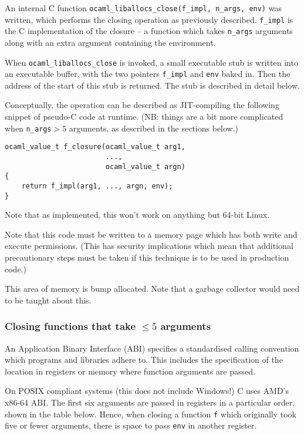 \documentclass[12pt,a4paper,twoside,openright]{report}
\begin{document}
An internal C function \lstinline{ocaml_liballocs_close(f_impl, n_args, env)}
was written, which performs the closing operation as previously described.
\lstinline!f_impl! is the C implementation of the closure -- a function which
takes \lstinline!n_args! arguments along with an extra argument containing the environment.

When \lstinline!ocaml_liballocs_close! is
invoked, a small executable stub is written into an executable
buffer, with the two pointers \lstinline!f_impl! and \lstinline!env! baked in.
Then the address of the start of this stub is returned. The stub is described
in detail below.

Conceptually, the operation can be described as JIT-compiling the following
snippet of pseudo-C code at runtime. (NB: things are a bit more complicated
when \lstinline!n_args!${} > 5$ arguments, as described in the sections below.)

\begin{lstlisting}
ocaml_value_t f_closure(ocaml_value_t arg1,
                        ...,
                        ocaml_value_t argn)
{
    return f_impl(arg1, ..., argn, env);
}
\end{lstlisting}

Note that as implemented, this won't work on anything but 64-bit Linux.

Note that this code must be written to a memory page which has both write and
execute permissions. (This has security implications which mean that additional
precautionary steps must be taken if this technique is to be used in production
code.)

This area of memory is bump allocated. Note that a garbage collector would need
to be taught about this.

\subsubsection{Closing functions that take $\le 5$ arguments}

An Application Binary Interface (ABI) specifies a standardised calling
convention which programs and libraries adhere to. This includes the
specification of the location in registers or memory where function arguments
are passed.

On POSIX compliant systems (this does not include Windows!) C uses AMD's x86-64
ABI. The first six arguments are passed in registers in a particular order,
shown in the table below. Hence, when closing a function \lstinline!f! which
originally took five or fewer arguments, there is space to pass \lstinline!env!
in another register.
\end{document}
